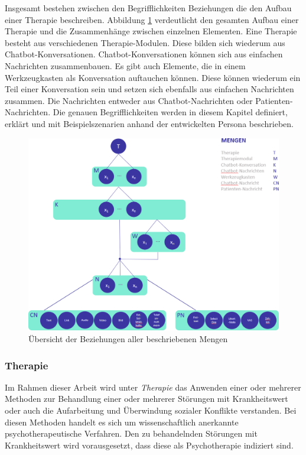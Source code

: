 Insgesamt bestehen zwischen den Begrifflichkeiten Beziehungen die den Aufbau einer Therapie beschreiben. Abbildung \ref{mengeninsg} verdeutlicht den gesamten Aufbau einer Therapie und die Zusammenhänge zwischen einzelnen Elementen. Eine Therapie besteht aus verschiedenen Therapie-Modulen. Diese bilden sich wiederum aus Chatbot-Konversationen. Chatbot-Konversationen können sich aus einfachen Nachrichten zusammenbauen. Es gibt auch Elemente, die in einem Werkzeugkasten als Konversation auftauchen können. Diese können wiederum ein Teil einer Konversation sein und setzen sich ebenfalls aus einfachen Nachrichten zusammen. Die Nachrichten entweder aus Chatbot-Nachrichten oder Patienten-Nachrichten. Die genauen Begrifflichkeiten werden in diesem Kapitel definiert, erklärt und mit Beispielszenarien anhand der entwickelten Persona beschrieben.

\begin{figure}[h]
	\centering
	\includegraphics[width=.75\textwidth]{pictures/mengeninsg}
	\caption{Übersicht der Beziehungen aller beschriebenen Mengen}
	\label{mengeninsg}
\end{figure}

\subsubsection{Therapie}
Im Rahmen dieser Arbeit wird unter \emph{Therapie} das Anwenden  einer oder mehrerer Methoden zur Behandlung einer oder mehrerer Störungen mit Krankheitswert oder auch die Aufarbeitung und Überwindung sozialer Konflikte verstanden. Bei diesen Methoden handelt es sich um wissenschaftlich anerkannte psychotherapeutische Verfahren. Den zu behandelnden Störungen mit Krankheitswert wird vorausgesetzt, dass diese als Psychotherapie indiziert sind.

